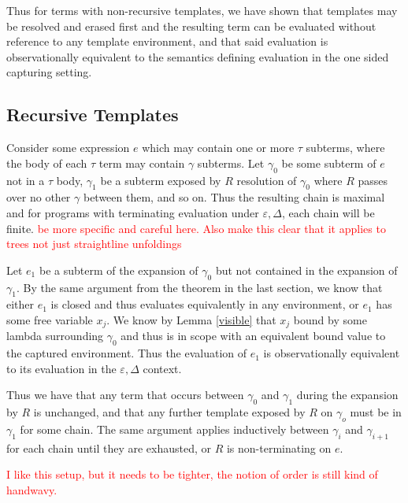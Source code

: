 \documentclass{article}
\newcommand{\todo}[1]{\textcolor{red}{#1}}
\newcommand{\ve}{\varepsilon}
\newcommand{\de}{\Delta}
\begin{document}
Thus for terms with non-recursive templates, we have shown that templates may be resolved and erased first and the resulting term can be evaluated without reference to any template environment, and that said evaluation is observationally equivalent to the semantics defining evaluation in the one sided capturing setting.

\subsection{Recursive Templates}

Consider some expression $e$ which may contain one or more $\tau$ subterms, where the body of each $\tau$ term may contain $\gamma$ subterms. Let $\gamma_0$ be some subterm of $e$ not in a $\tau$ body, $\gamma_1$ be a subterm exposed by $R$ resolution of $\gamma_0$ where $R$ passes over no other $\gamma$ between them, and so on. Thus the resulting chain is maximal and for programs with terminating evaluation under $\ve,\de$, each chain will be finite. \todo{be more specific and careful here. Also make this clear that it applies to trees not just straightline unfoldings} 

Let $e_1$ be a subterm of the expansion of $\gamma_0$ but not contained in the expansion of $\gamma_1$. By the same argument from the theorem in the last section, we know that either $e_1$ is closed and thus evaluates equivalently in any environment, or $e_1$ has some free variable $x_j$. We know by Lemma \ref{visible} that $x_j$ bound by some lambda surrounding $\gamma_0$ and thus is in scope with an equivalent bound value to the captured environment. Thus the evaluation of $e_1$ is observationally equivalent to its evaluation in the $\ve,\de$ context. 

Thus we have that any term that occurs between $\gamma_0$ and $\gamma_1$ during  the expansion by $R$ is unchanged, and that any further template exposed by $R$ on $\gamma_o$ must be in $\gamma_1$ for some chain. The same argument applies inductively between $\gamma_i$ and $\gamma_{i+1}$ for each chain until they are exhausted, or $R$ is non-terminating on $e$.

\todo{I like this setup, but it needs to be tighter, the notion of order is still kind of handwavy.}


\end{document}

